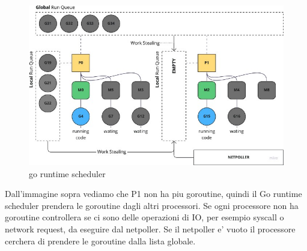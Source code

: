 \begin{figure}[h!]
    \centering
    \includegraphics[width=12cm]{sections/runtime-go3.jpeg}
    \caption{go runtime scheduler}
    \label{fig:title}
\end{figure}

Dall'immagine sopra vediamo che P1 non ha piu goroutine, quindi il Go runtime scheduler prendera le goroutine dagli altri processori. Se ogni processore non ha goroutine controllera se ci sono delle operazioni di IO, per esempio syscall o network request, da eseguire dal netpoller. Se il netpoller e' vuoto il processore cerchera di prendere le goroutine dalla lista globale.